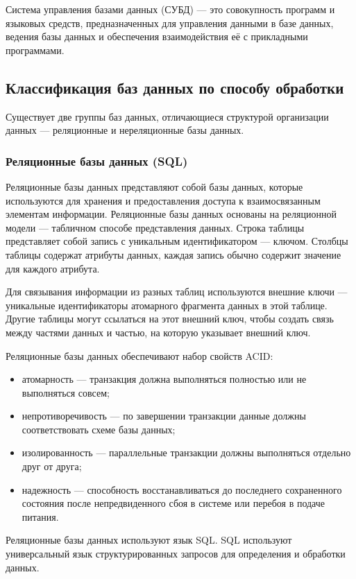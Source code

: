Система управления базами данных (СУБД) --- это совокупность программ и языковых средств, предназначенных для управления данными в базе данных, ведения базы данных и обеспечения взаимодействия её с прикладными программами.

\subsection{Классификация баз данных по способу обработки}

Существует две группы баз данных, отличающиеся структурой организации данных --- реляционные и нереляционные базы данных.

\subsubsection{Реляционные базы данных (SQL)}

Реляционные базы данных представляют собой базы данных, которые используются для хранения и предоставления доступа к взаимосвязанным элементам информации. Реляционные базы данных основаны на реляционной модели --- табличном способе представления данных. Строка таблицы представляет собой запись с уникальным идентификатором --- ключом. Столбцы таблицы содержат атрибуты данных, каждая запись обычно содержит значение для каждого атрибута. 

Для связывания информации из разных таблиц используются внешние ключи --- уникальные идентификаторы атомарного фрагмента данных в этой таблице. Другие таблицы могут ссылаться на этот внешний ключ, чтобы создать связь между частями данных и частью, на которую указывает внешний ключ.

Реляционные базы данных обеспечивают набор свойств ACID:

\begin{itemize}
	\item атомарность --- транзакция должна выполняться полностью или не выполняться совсем;
	\item непротиворечивость --- по завершении транзакции данные должны соответствовать схеме базы данных;
	\item изолированность --- параллельные транзакции должны выполняться отдельно друг от друга;
	\item надежность --- способность восстанавливаться до последнего сохраненного состояния после непредвиденного сбоя в системе или перебоя в подаче питания.
\end{itemize}

Реляционные базы данных используют язык SQL. SQL используют универсальный язык структурированных запросов для определения и обработки данных.

